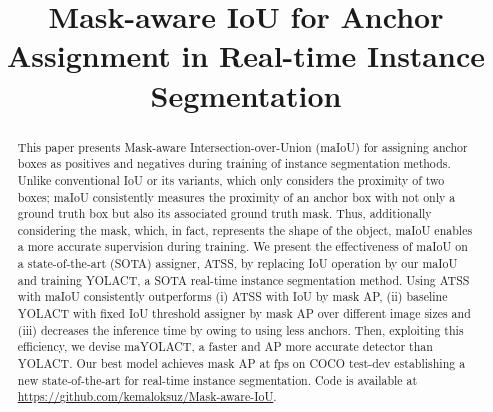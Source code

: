 \documentclass{bmvc2k}
\title{Mask-aware IoU for Anchor Assignment in Real-time Instance Segmentation}
\begin{document}
\maketitle

\begin{abstract}
This paper presents Mask-aware Intersection-over-Union (maIoU) for assigning anchor boxes as positives and negatives during training of instance segmentation methods. Unlike conventional IoU or its variants, which only considers the proximity of two boxes; maIoU consistently measures the proximity of an anchor box with not only a ground truth box but also its associated ground truth mask. Thus, additionally considering  the mask, which, in fact, represents the shape of the object, maIoU enables a more accurate supervision during training. We present the effectiveness of maIoU on a state-of-the-art (SOTA) assigner, ATSS, by replacing IoU operation by our maIoU and training YOLACT, a SOTA real-time instance segmentation method. Using ATSS with maIoU consistently outperforms (i) ATSS with IoU by  mask AP, (ii) baseline YOLACT with fixed IoU threshold assigner by  mask AP over different image sizes and (iii) decreases the inference time by  owing to using less anchors. Then, exploiting this efficiency, we devise maYOLACT, a faster and  AP more accurate detector than YOLACT. Our best model achieves  mask AP at  fps on COCO test-dev establishing a new state-of-the-art for real-time instance segmentation. Code is available at \url{https://github.com/kemaloksuz/Mask-aware-IoU}.
\end{abstract}
\end{document}
